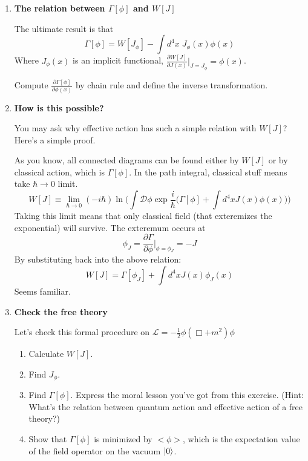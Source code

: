 \documentclass[11pt]{article}
\begin{document}
\begin{enumerate}
\begin{problem}{\points{-}}
		\end{problem}
	\item
	\begin{problem}{\points{-}}
		\textbf{The relation between $\Gamma[\phi]$ and $W[J]$}
		
		\noindent
		The ultimate result is that 
		\[
		\Gamma[\phi] = W[J_\phi] - \int d^4x \; J_\phi(x) \phi(x)
		\]
		Where $J_\phi(x)$ is an implicit functional, $\frac{\partial W[J]}{\partial J(x)}\Big|_{J=J_{\phi}} = \phi(x) $.
		
		Compute $\frac{\partial \Gamma[\phi]}{\partial \phi(x)}$ by chain rule and define the inverse transformation.
	\end{problem}

	\item
\begin{problem}{}
	\textbf{How is this possible?}
	
	\noindent
	You may ask why effective action has such a simple relation with $W[J]$? Here's a simple proof.
	
	As you know, all connected diagrams can be found either by $W[J]$ or by classical action, which is $\Gamma[\phi]$. In the path integral, classical stuff means take $\hbar \xrightarrow{} 0$ limit.
	\[
	W[J] \equiv \lim_{\hbar \to 0} (-i\hbar) \ln \Big(
	\int \mathcal{D}\phi \exp{\frac{i}{\hbar} \big(\Gamma[\phi] + \int d^4x J(x)\phi(x)\big)}
	\Big)
	\]
	Taking this limit means that only classical field (that exteremizes the exponential) will survive. The exteremum occurs at
	\[
	\phi_J = \frac{\partial \Gamma}{\partial \phi}\Big|_{\phi = \phi_J} = -J
	\] 
	By substituting back into the above relation:
	\[
	W[J] = \Gamma[\phi_J] + \int d^4x J(x)\phi_J(x)
	\]
	Seems familiar.
\end{problem}

\item
\begin{problem}{\points{-}}
	\textbf{Check the free theory}
	
	Let's check this formal procedure on $\mathscr{L} = -\frac12 \phi (\Box + m^2) \phi$
	
	\noindent
	\begin{enumerate}
		\item Calculate $W[J]$.
		\item Find $J_\phi$.
		\item Find $\Gamma[\phi]$. Express the moral lesson you've got from this exercise. (Hint: What's the relation between quantum action and effective action of a free theory?)
		\item Show that $\Gamma[\phi]$ is minimized by $<\!\!\phi\!\!>$, which is the expectation value of the field operator on the vacuum $\ket{0}$.
	\end{enumerate}
\end{problem}
\end{enumerate}
\end{document}

